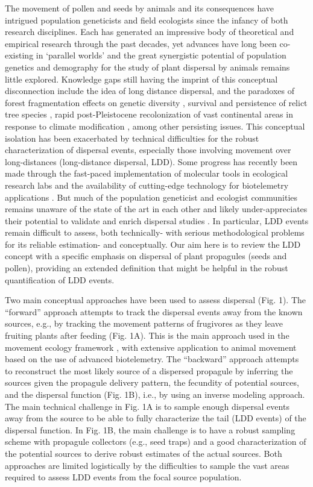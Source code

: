 \documentclass[a4paper, 12pt]{article}
\begin{document}
\begin{linenumbers}
The movement of pollen and seeds by animals and its consequences have intrigued population geneticists and field ecologists since the infancy of both research disciplines. Each has generated an impressive body of theoretical and empirical research through the past decades, yet advances have long been co-existing in ‘parallel worlds’ and the great synergistic potential of population genetics and demography for the study of plant dispersal by animals remains little explored. Knowledge gaps still having the imprint of this conceptual disconnection include the idea of long distance dispersal, and the paradoxes of forest fragmentation effects on genetic diversity \citep{Kramer:2008kg}, survival and persistence of relict tree species \citep{Hampe:2011bv}, rapid post-Pleistocene recolonization of vast continental areas in response to climate modification \citep{Clark:1998aa,Clark:1998vi}, among other persisting issues. This conceptual isolation has been exacerbated by technical difficulties for the robust characterization of dispersal events, especially those involving movement over long-distances (long-distance dispersal, LDD). Some progress has recently been made through the fast-paced implementation of molecular tools in ecological research labs and the availability of cutting-edge technology for biotelemetry applications . But much of the population geneticist and ecologist communities remains unaware of the state of the art in each other and likely under-appreciates their potential to validate and enrich dispersal studies \citep{Jones:2008il}. In particular, LDD events remain difficult to assess, both technically- with serious methodological problems for its reliable estimation- and conceptually. Our aim here is to review the LDD concept with a specific emphasis on dispersal of plant propagules (seeds and pollen), providing an extended definition that might be helpful in the robust quantification of LDD events.   

Two main conceptual approaches have been used to assess dispersal (Fig. 1). The “forward” approach attempts to track the dispersal events away from the known sources, e.g., by tracking the movement patterns of frugivores as they leave fruiting plants after feeding (Fig. 1A). This is the main approach used in the movement ecology framework \citep{Nathan:2008fx}, with extensive application to animal movement based on the use of advanced biotelemetry. The “backward” approach attempts to reconstruct the most likely source of a dispersed propagule by inferring the sources given the propagule delivery pattern, the fecundity of potential sources, and the dispersal function (Fig. 1B), i.e., by using an inverse modeling approach. The main technical challenge in Fig. 1A is to sample enough dispersal events away from the source to be able to fully characterize the tail (LDD events) of the dispersal function. In Fig. 1B, the main challenge is to have a robust sampling scheme with propagule collectors (e.g., seed traps) and a good characterization of the potential sources to derive robust estimates of the actual sources. Both approaches are limited logistically by the difficulties to sample the vast areas required to assess LDD events from the focal source population.    


\end{linenumbers}
\end{document}
